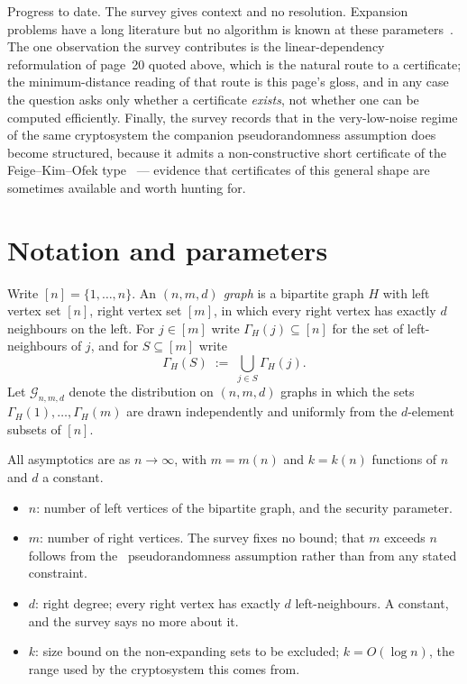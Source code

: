 \documentclass{conjura-conjecture}
\newcommand{\Gnmd}{\mathcal{G}_{n,m,d}}
\newcommand{\Nbr}{\Gamma_H}
\begin{document}
Progress to date. The survey gives context and no resolution. Expansion
problems have a long literature but no algorithm is known at these
parameters~\cite{HLW06}. The one observation the survey contributes is
the linear-dependency reformulation of page~20 quoted above, which is
the natural route to a certificate; the minimum-distance reading of
that route is this page's gloss, and in any case the question asks only
whether a certificate \emph{exists}, not whether one can be computed
efficiently. Finally, the survey records that in the very-low-noise
regime of the same cryptosystem the companion pseudorandomness
assumption does become structured, because it admits a non-constructive
short certificate of the Feige--Kim--Ofek type~\cite{FKO06} --- evidence
that certificates of this general shape are sometimes available and
worth hunting for.

\section{Notation and parameters}\label{sec:notation}

Write $[n] = \{1,\dots,n\}$. An \emph{$(n,m,d)$ graph} is a bipartite
graph $H$ with left vertex set $[n]$, right vertex set $[m]$, in which
every right vertex has exactly $d$ neighbours on the left. For
$j \in [m]$ write $\Nbr(j) \subseteq [n]$ for the set of
left-neighbours of $j$, and for $S \subseteq [m]$ write
\[
  \Nbr(S) \;:=\; \bigcup_{j \in S} \Nbr(j) .
\]
Let $\Gnmd$ denote the distribution on $(n,m,d)$ graphs in which the
sets $\Nbr(1),\dots,\Nbr(m)$ are drawn independently and uniformly from
the $d$-element subsets of $[n]$.

All asymptotics are as $n \to \infty$, with $m = m(n)$ and $k = k(n)$
functions of $n$ and $d$ a constant.

\begin{itemize}[leftmargin=1.2em]
\item $n$: number of left vertices of the bipartite graph, and the
  security parameter.
\item $m$: number of right vertices. The survey fixes no bound; that
  $m$ exceeds $n$ follows from the~\cite{ABW10} pseudorandomness
  assumption rather than from any stated constraint.
\item $d$: right degree; every right vertex has exactly $d$
  left-neighbours. A constant, and the survey says no more about it.
\item $k$: size bound on the non-expanding sets to be excluded;
  $k = O(\log n)$, the range used by the cryptosystem this comes from.
\end{itemize}
\end{document}
